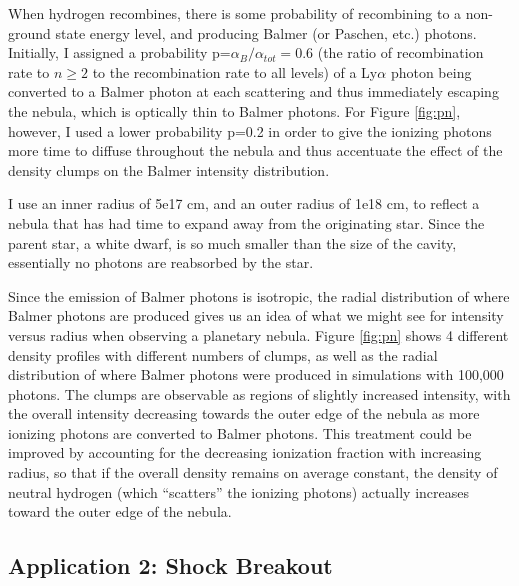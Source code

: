 \documentclass{amsart}
\begin{document}
When hydrogen recombines, there is some probability of recombining to a non-ground state energy level, and producing Balmer (or Paschen, etc.) photons.  Initially, I assigned a probability p=$\alpha_B/\alpha_{tot}=0.6$ (the ratio of recombination rate to $n\geq2$ to the recombination rate to all levels) of a Ly$\alpha$ photon being converted to a Balmer photon at each scattering and thus immediately escaping the nebula, which is optically thin to Balmer photons.  For Figure \ref{fig:pn}, however, I used a lower probability p=0.2 in order to give the ionizing photons more time to diffuse throughout the nebula and thus accentuate the effect of the density clumps on the Balmer intensity distribution.

I use an inner radius of 5e17 cm, and
an outer radius of 1e18 cm, to reflect a nebula that has had time to expand away from the originating star.  Since the parent star, a white dwarf, is so much smaller than the size of the cavity, essentially no photons are reabsorbed by the star.

Since the emission of Balmer photons is isotropic, the radial distribution of where Balmer photons are produced gives us an idea of what we might see for intensity versus radius when observing a planetary nebula.  Figure \ref{fig:pn} shows 4 different density profiles with different numbers of clumps, as well as the radial distribution of where Balmer photons were produced in simulations with 100,000 photons.  The clumps are observable as regions of slightly increased intensity, with the overall intensity decreasing towards the outer edge of the nebula as more ionizing photons are converted to Balmer photons.  This treatment could be improved by accounting for the decreasing ionization fraction with increasing radius, so that if the overall density remains on average constant, the density of neutral hydrogen (which ``scatters'' the ionizing photons) actually increases toward the outer edge of the nebula.

\subsection{Application 2: Shock Breakout}
\end{document}
